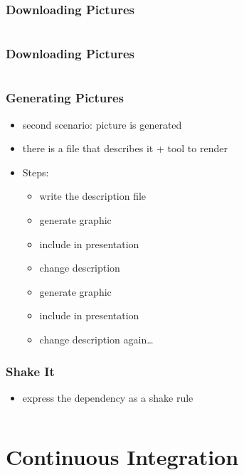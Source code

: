 \documentclass{beamer}
\begin{document}
\begin{frame}
  \frametitle{Downloading Pictures}
    \begin{center}
    \inputminted{text}{images/maintain-make.src}
  \end{center}
\end{frame}

\begin{frame}
  \frametitle{Downloading Pictures}
    \begin{center}
    \inputminted{haskell}{snippets/download-images.hs}
  \end{center}
\end{frame}

\begin{frame}
  \frametitle{Generating Pictures}
  \begin{itemize}
  \item second scenario: picture is generated
  \item there is a file that describes it + tool to render
  \item Steps:
    \begin{itemize}
    \item write the description file
    \item generate graphic
    \item include in presentation
    \item change description
    \item generate graphic
    \item include in presentation
    \item change description again\ldots{}
    \end{itemize}
  \end{itemize}
\end{frame}

\begin{frame}
  \frametitle{Shake It}
  \begin{itemize}
  \item express the dependency as a shake rule
  \end{itemize}
  \inputminted{haskell}{snippets/graphviz-rule.hs}
\end{frame}

\section{Continuous Integration}
\end{document}
